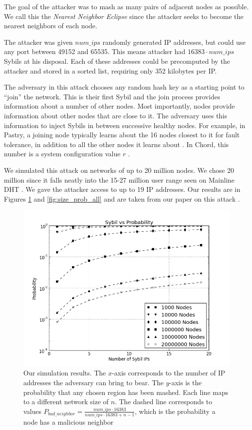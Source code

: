 The goal of the attacker was to mash as many pairs of adjacent nodes as possible.
We call this the \textit{Nearest Neighbor Eclipse} since the attacker seeks to become the nearest neighbors of each node.

The attacker was given $num\_ips$ randomly generated IP addresses, but could use any port between 49152 and 65535.
This means attacker had $ 16383 \cdot num\_ips $ Sybils at his disposal.
Each of these addresses could  be precomputed by the attacker and stored in a sorted list, requiring only 352 kilobytes per IP.

The adversary in this attack chooses any random hash key as a starting point to ``join'' the network.
This is their first Sybil and the join process provides information about a number of other nodes.
Most importantly, nodes provide information about other nodes that are close to it.
The adversary uses this information to inject Sybils in between successive healthy nodes.
For example, in Pastry, a joining node typically learns about the 16 nodes closest to it for fault tolerance, in addition to all the other nodes it learns about  \cite{pastry}.
In Chord, this number is a system configuration value $r$ \cite{chord}.

We simulated this attack on networks of up to 20 million nodes.
We chose 20 million since it falls neatly into the 15-27 million user range seen on Mainline DHT \cite{mainlineMeasure}.
We gave the attacker access to up to 19 IP addresses.
Our results are in Figures \ref{fig:exp2} and \ref{fig:size_prob_all} and are taken from our paper on this attack \cite{sybil-analysis}.

\begin{figure}
	\centering
	\includegraphics[width=0.5\linewidth]{figs/ip_prob_all}
	\caption[foo]{Our simulation results.  
		The $x$-axis corresponds to the number of IP addresses the adversary can bring to bear.
		The $y$-axis is the probability that any chosen region has been mashed.
		Each line maps to a different network size of $n$.
		The dashed line corresponds to values  $ P_{bad\_neighbor} =  \frac{num\_ips \cdot 16383}{num\_ips \cdot 16383 + n - 1}$, which is the probability a node has a malicious neighbor}
	\label{fig:exp2}
\end{figure}



